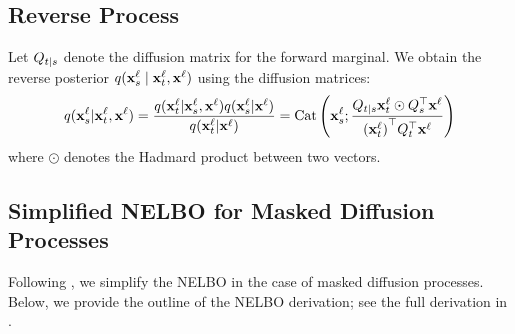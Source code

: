 \documentclass{article} %
\begin{document}
\subsection{Reverse Process}

Let $Q_{t|s}$ denote the diffusion matrix for the forward marginal. We obtain the reverse posterior $q({\mathbf x}^\ell_s \mid {\mathbf x}^\ell_t, {\mathbf x}^\ell)$ using the diffusion matrices:
\begin{align}
q({\mathbf x}^\ell_{s} | {\mathbf x}^\ell_t, {\mathbf x}^\ell) = \frac{q({\mathbf x}^\ell_t | {\mathbf x}^\ell_{s}, {\mathbf x}^\ell) q({\mathbf x}^\ell_{s} | {\mathbf x}^\ell)}{q({\mathbf x}^\ell_t | {\mathbf x}^\ell)} = \text{Cat} \left( {\mathbf x}^\ell_{s}; \frac{Q_{t|s} {\mathbf x}^\ell_t \odot Q_s^\top {\mathbf x}^\ell}{{({\mathbf x}^\ell_t)}^\top  Q_t^\top {\mathbf x}^\ell} \right)
\end{align}
\noindent where $\odot$ denotes the Hadmard product between two vectors.



\subsection{Simplified NELBO for Masked Diffusion Processes} \label{supp:elbo}


Following \cite{sahoo2024simple, shi2024simplified, ou2025your}, we simplify the NELBO in the case of masked diffusion processes. Below, we provide the outline of the NELBO derivation; see the full derivation in \cite{sahoo2024simple, shi2024simplified, ou2025your}.

\end{document}
